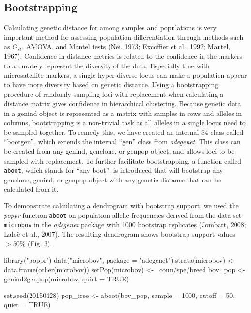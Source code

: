 \documentclass{frontiersSCNS} %
\newenvironment{CodeChunk}{}{}
\begin{document}
\subsection*{Bootstrapping}\label{bootstrapping}

Calculating genetic distance for among samples and populations is very
important method for assessing population differentiation through
methods such as \(G_{st}\), AMOVA, and Mantel tests (Nei, 1973;
Excoffier et al., 1992; Mantel, 1967). Confidence in distance metrics is
related to the confidence in the markers to accurately represent the
diversity of the data. Especially true with microsatellite markers, a
single hyper-diverse locus can make a population appear to have more
diversity based on genetic distance. Using a bootstrapping procedure of
randomly sampling loci with replacement when calculating a distance
matrix gives confidence in hierarchical clustering. Because genetic data
in a genind object is represented as a matrix with samples in rows and
alleles in columns, bootstrapping is a non-trivial task as all alleles
in a single locus need to be sampled together. To remedy this, we have
created an internal S4 class called ``bootgen'', which extends the
internal ``gen'' class from \emph{adegenet}. This class can be created
from any genind, genclone, or genpop object, and allows loci to be
sampled with replacement. To further facilitate bootstrapping, a
function called \texttt{aboot}, which stands for ``any boot'', is
introduced that will bootstrap any genclone, genind, or genpop object
with any genetic distance that can be calculated from it.

To demonstrate calculating a dendrogram with bootstrap support, we used
the \emph{poppr} function \texttt{aboot} on population allelic
frequencies derived from the data set \texttt{microbov} in the
\emph{adegenet} package with 1000 bootstrap replicates (Jombart, 2008;
Lalo{ë} et al., 2007). The resulting dendrogram shows bootstrap support
values \(>50\%\) (Fig. 3).

\begin{CodeChunk}
\begin{CodeInput}
library("poppr")
data("microbov", package = "adegenet") 
strata(microbov) <- data.frame(other(microbov)) 
setPop(microbov) <- ~coun/spe/breed 
bov_pop <- genind2genpop(microbov, quiet = TRUE) 

set.seed(20150428)
pop_tree <- aboot(bov_pop, sample = 1000, cutoff = 50, quiet = TRUE)
\end{CodeInput}
\end{CodeChunk}
\end{document}
